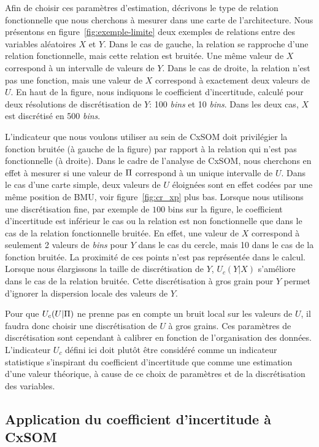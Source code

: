 \documentclass[../main]{subfiles}
\begin{document}
Afin de choisir ces paramètres d'estimation, décrivons le type de relation fonctionnelle que nous cherchons à mesurer dans une carte de l'architecture.
Nous présentons en figure~\ref{fig:exemple-limite} deux exemples de relations entre des variables aléatoires $X$ et $Y$. Dans le cas de gauche, la relation se rapproche d'une relation fonctionnelle, mais cette relation est bruitée. Une même valeur de $X$ correspond à un intervalle de valeurs de $Y$. Dans le cas de droite, la relation n'est pas une fonction, mais une valeur de $X$ correspond à exactement deux valeurs de $U$. En haut de la figure, nous indiquons le coefficient d'incertitude, calculé pour deux résolutions de discrétisation de $Y$: 100 \emph{bins} et 10 \emph{bins}. Dans les deux cas, $X$ est discrétisé en 500 \emph{bins}.


L'indicateur que nous voulons utiliser au sein de CxSOM doit privilégier la fonction bruitée (à gauche de la figure) par rapport à la relation qui n'est pas fonctionnelle (à droite).
Dans le cadre de l'analyse de CxSOM, nous cherchons en effet à mesurer si une valeur de $\Pi$ correspond à un unique intervalle de $U$. 
Dans le cas d'une carte simple, deux valeurs de $U$ éloignées sont en effet codées par une même position de BMU, voir figure~\ref{fig:cr_xp} plus bas.
Lorsque nous utilisons une discrétisation fine, par exemple de $100$ bins sur la figure, le coefficient d'incertitude est inférieur le cas ou la relation est non fonctionnelle que dans le cas de la relation fonctionnelle bruitée.
En effet, une valeur de $X$ correspond à seulement 2 valeurs de \emph{bins} pour $Y$ dans le cas du cercle, mais 10 dans le cas de la fonction bruitée. La proximité de ces points n'est pas représentée dans le calcul.
Lorsque nous élargissons la taille de discrétisation de $Y$, $U_c(Y|X)$ s'améliore dans le cas de la relation bruitée. Cette discrétisation à gros grain pour $Y$ permet d'ignorer la dispersion locale des valeurs de $Y$.

Pour que $U_c(U|\Pi)$ ne prenne pas en compte un bruit local sur les valeurs de $U$, il faudra donc choisir une discrétisation de $U$ à gros grains. Ces paramètres de discrétisation sont cependant à calibrer en fonction de l'organisation des données.
L'indicateur $U_c$ défini ici doit plutôt être considéré comme un indicateur statistique s'inspirant du coefficient d'incertitude que comme une estimation d'une valeur théorique, à cause de ce choix de paramètres et de la discrétisation des variables.

\subsection{Application du coefficient d'incertitude à CxSOM}
\end{document}
